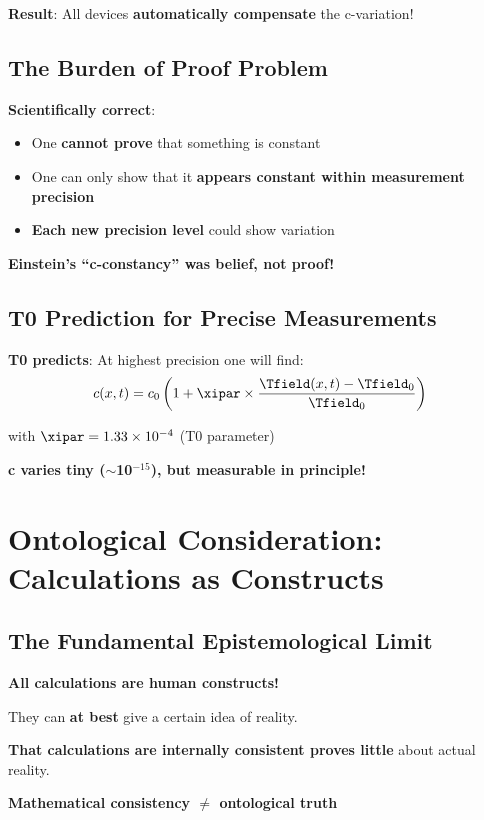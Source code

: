 	\textbf{Result}: All devices \textbf{automatically compensate} the c-variation!
	
	\subsection{The Burden of Proof Problem}
	
	\textbf{Scientifically correct}:
	\begin{itemize}
		\item One \textbf{cannot prove} that something is constant
		\item One can only show that it \textbf{appears constant within measurement precision}
		\item \textbf{Each new precision level} could show variation
	\end{itemize}
	
	\textbf{Einstein's ``c-constancy'' was belief, not proof!}
	
	\subsection{T0 Prediction for Precise Measurements}
	
	\textbf{T0 predicts}: At highest precision one will find:
	\begin{equation}
		c(x,t) = c_0 \left(1 + \xipar \times \frac{\Tfield(x,t) - \Tfield_0}{\Tfield_0}\right)
	\end{equation}
	
	with $\xipar = 1.33 \times 10^{-4}$ (T0 parameter)
	
	\textbf{c varies tiny ($\sim$10$^{-15}$), but measurable in principle!}
	
	\section{Ontological Consideration: Calculations as Constructs}
	
	\subsection{The Fundamental Epistemological Limit}
	
	\begin{tcolorbox}[colback=purple!5!white,colframe=purple!75!black,title=Ontological Truth]
		\textbf{All calculations are human constructs!}
		
		They can \textbf{at best} give a certain idea of reality.
		
		\textbf{That calculations are internally consistent proves little} about actual reality.
		
		\textbf{Mathematical consistency $\neq$ ontological truth}
	\end{tcolorbox}
	
